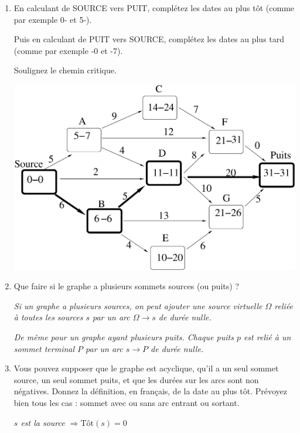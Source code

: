 \documentclass[11pt]{article}
\begin{document}
\begin{enumerate}

\item 
En calculant de SOURCE vers PUIT, complétez les dates au plus tôt (comme par exemple 0- et 5-).


Puis en calculant de  PUIT vers SOURCE, complétez les dates au plus tard (comme par exemple -0 et -7).

Soulignez le chemin critique.

\begin{center}
\includegraphics[width=0.95\linewidth]{critique_solution.eps}
\end{center}




\item Que faire si le graphe a plusieurs sommets sources (ou puits) ?

\emph{Si un graphe a plusieurs sources, on peut ajouter une source virtuelle
$\Omega$  reliée à toutes les sources $s$  par un arc $\Omega\rightarrow s$  de durée nulle.}

 \emph{De même pour un graphe ayant plusieurs puits.
Chaque  puits $p$ est relié à un sommet terminal $P$  par un arc
$s\rightarrow P$ de durée nulle. 
}

\item  Vous pouvez supposer que le graphe est acyclique, qu'il a un seul sommet source, un seul sommet puits, et que les durées sur les arcs sont non négatives.
Donnez la définition, en français, de la date au plus
tôt. Prévoyez bien tous les cas : sommet avec ou sans arc entrant ou
sortant.

{\it
$s$ est la source  $\Rightarrow \mbox{Tôt}(s) = 0$

}
\end{enumerate}
\end{document}
